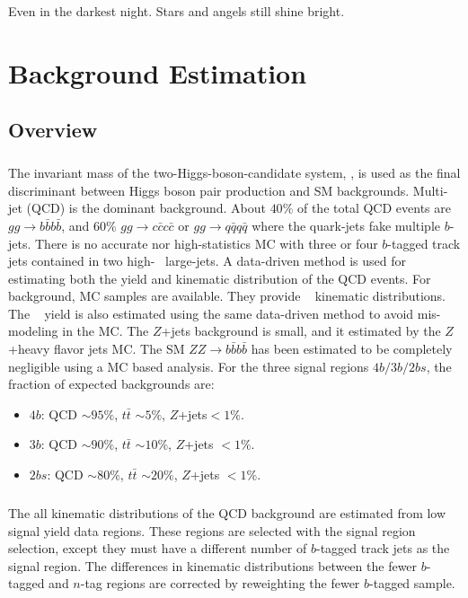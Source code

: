 \begin{savequote}[75mm]
Even in the darkest night. Stars and angels still shine bright.   
\end{savequote}


\chapter{Background Estimation}

\section{Overview}
\paragraph{}
The invariant mass of the two-Higgs-boson-candidate system, \mtwoJ, is used as the final discriminant between Higgs boson pair production and SM backgrounds.
Multi-jet (QCD) is the dominant background.
About $40\%$ of the total QCD events are $gg \to b\bar{b}b\bar{b}$, and $60\%$ $gg \to c\bar{c}c\bar{c}$ or $gg \to q\bar{q}q\bar{q}$ where the quark-jets fake multiple $b$-jets.
There is no accurate nor high-statistics MC with three or four $b$-tagged track jets contained in two high-\pt~ large-\R jets.
A data-driven method is used for estimating both the yield and kinematic distribution of the QCD events.
For \ttbar~ background, MC samples are available. 
They provide \ttbar~ kinematic distributions.
The \ttbar~ yield is also estimated using the same data-driven method to avoid mis-modeling in the MC.
The $Z$+jets background is small, and it estimated by the $Z$+heavy flavor jets MC.
The SM $ZZ\to b\bar{b}b\bar{b}$ has been estimated to be completely negligible using a MC based analysis.
For the three signal regions $4b/3b/2bs$, the fraction of expected backgrounds are:
\begin{itemize}
	\item $4b$: QCD $\sim 95\%$, $t\bar{t}$ $\sim 5\%$, $Z$+jets$< 1\%$. 
	\item $3b$: QCD $\sim 90\%$, $t\bar{t}$ $\sim 10\%$, $Z$+jets $< 1\%$.  
	\item $2bs$: QCD $\sim 80\%$, $t\bar{t}$ $\sim 20\%$, $Z$+jets $< 1\%$.
\end{itemize}

\paragraph{}
The all kinematic distributions of the QCD background are estimated from low signal yield data regions.
These regions are selected with the signal region selection, except they must have a different number of $b$-tagged track jets as the signal region.
The differences in kinematic distributions between the fewer $b$-tagged and $n$-tag regions are corrected by reweighting the fewer $b$-tagged sample.

